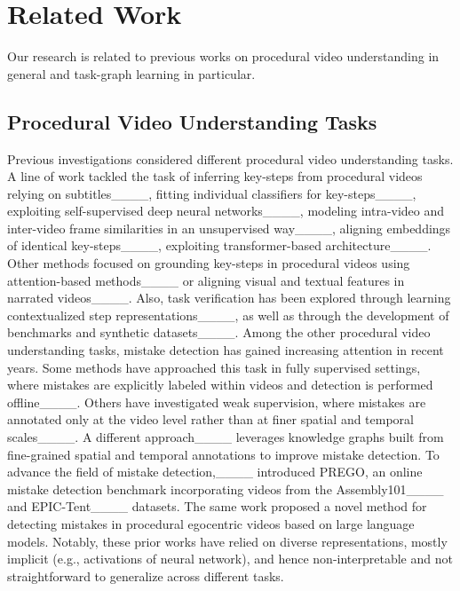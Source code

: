 \section{Related Work}
Our research is related to previous works on procedural video understanding in general and task-graph learning in particular.

\subsection{Procedural Video Understanding Tasks}
\label{sec:procedure_understanding}
Previous investigations considered different procedural video understanding tasks.
A line of work tackled the task of inferring key-steps from procedural videos relying on subtitles____, fitting individual classifiers for key-steps____, exploiting self-supervised deep neural networks____, modeling intra-video and inter-video frame similarities in an unsupervised way____, aligning embeddings of identical key-steps____, exploiting transformer-based architecture____.
Other methods focused on grounding key-steps in procedural videos using attention-based methods____ or aligning visual and textual features in narrated videos____. Also, task verification has been explored through learning contextualized step representations____, as well as through the development of benchmarks and synthetic datasets____.
Among the other procedural video understanding tasks, mistake detection has gained increasing attention in recent years. Some methods have approached this task in fully supervised settings, where mistakes are explicitly labeled within videos and detection is performed offline____. Others have investigated weak supervision, where mistakes are annotated only at the video level rather than at finer spatial and temporal scales____. A different approach____ leverages knowledge graphs built from fine-grained spatial and temporal annotations to improve mistake detection.
To advance the field of mistake detection,____ introduced PREGO, an online mistake detection benchmark incorporating videos from the Assembly101____ and EPIC-Tent____ datasets. The same work proposed a novel method for detecting mistakes in procedural egocentric videos based on large language models.
Notably, these prior works have relied on diverse representations, mostly implicit (e.g., activations of neural network), and hence non-interpretable and not straightforward to generalize across different tasks.

